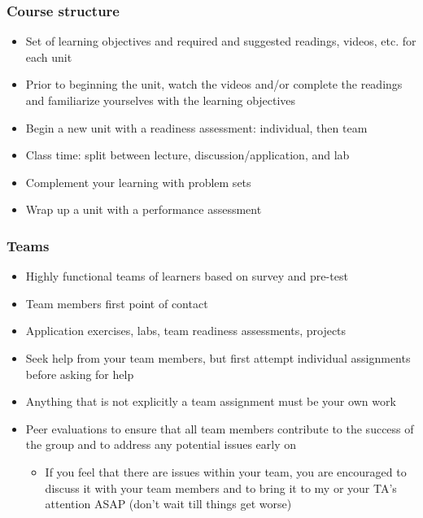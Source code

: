 \documentclass[slidestop,compress,mathserif,12pt,t,professionalfonts,xcolor=table]{beamer}
\begin{document}
\begin{frame}
\frametitle{Course structure}

\begin{itemize}[<alert@+>]
\item Set of learning objectives and required and suggested readings, videos, etc. for each unit
\item Prior to beginning the unit, watch the videos and/or complete the readings and familiarize yourselves with the learning objectives
\item Begin a new unit with a readiness assessment: individual, then team 
\item Class time: split between lecture, discussion/application, and lab
\item Complement your learning with problem sets
\item Wrap up a unit with a performance assessment
\end{itemize}

\end{frame}


\begin{frame}
\frametitle{Teams}

\begin{itemize}
\item Highly functional teams of learners based on survey and pre-test

\item Team members first point of contact

\item Application exercises, labs, team readiness assessments, projects

\item Seek help from your team members, but first attempt individual assignments before asking for help

\item Anything that is not explicitly a team assignment must be your own work

\item Peer evaluations to ensure that all team members contribute to the success of the group and to address any potential issues early on
\begin{itemize}
\item If you feel that there are issues within your team, you are encouraged to discuss it with your team members and to bring it to my or your TA's attention ASAP (don't wait till things get worse)
\end{itemize}

\end{itemize}

\end{frame}
\end{document}
